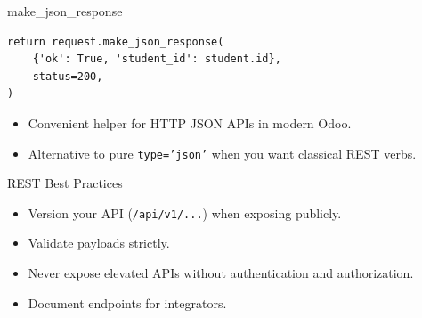 \begin{frame}[fragile]{make\_json\_response}
\begin{lstlisting}
return request.make_json_response(
	{'ok': True, 'student_id': student.id},
	status=200,
)
\end{lstlisting}
	\begin{itemize}
		\item Convenient helper for HTTP JSON APIs in modern Odoo.
		\item Alternative to pure \texttt{type='json'} when you want classical REST verbs.
	\end{itemize}
\end{frame}

\begin{frame}{REST Best Practices}
	\begin{itemize}
		\item Version your API (\texttt{/api/v1/...}) when exposing publicly.
		\item Validate payloads strictly.
		\item Never expose elevated APIs without authentication and authorization.
		\item Document endpoints for integrators.
	\end{itemize}
\end{frame}
